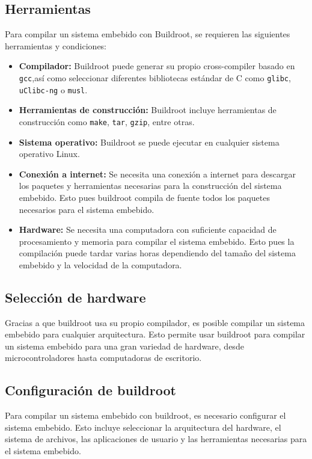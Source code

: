 \documentclass[12pt, letterpaper]{article}
\begin{document}
	\subsection{Herramientas}

	Para compilar un sistema embebido con Buildroot, se requieren las siguientes herramientas y condiciones:

	\begin{itemize}
		\item \textbf{Compilador:} Buildroot puede generar su propio cross-compiler basado en \texttt{gcc},así como seleccionar diferentes bibliotecas estándar de C como \texttt{glibc}, \texttt{uClibc-ng} o \texttt{musl}.
		\item \textbf{Herramientas de construcción:} Buildroot incluye herramientas de construcción como \texttt{make}, \texttt{tar}, \texttt{gzip}, entre otras.
		\item \textbf{Sistema operativo:} Buildroot se puede ejecutar en cualquier sistema operativo Linux.
		\item \textbf{Conexión a internet:} Se necesita una conexión a internet para descargar los paquetes y herramientas necesarias para la construcción del sistema embebido. Esto pues buildroot compila de fuente todos los paquetes necesarios para el sistema embebido.
		\item \textbf{Hardware:} Se necesita una computadora con suficiente capacidad de procesamiento y memoria para compilar el sistema embebido. Esto pues la compilación puede tardar varias horas dependiendo del tamaño del sistema embebido y la velocidad de la computadora.
	\end{itemize}

	\subsection{Selección de hardware}

	Gracias a que buildroot usa su propio compilador, es posible compilar un sistema embebido para cualquier arquitectura. Esto permite usar buildroot para compilar un sistema embebido para una gran variedad de hardware, desde microcontroladores hasta computadoras de escritorio.

	\subsection{Configuración de buildroot}

	Para compilar un sistema embebido con buildroot, es necesario configurar el sistema embebido. Esto incluye seleccionar la arquitectura del hardware, el sistema de archivos, las aplicaciones de usuario y las herramientas necesarias para el sistema embebido.
\end{document}
